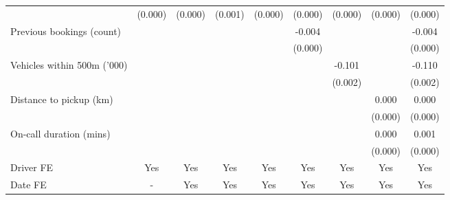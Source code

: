 \documentclass[reviewmode]{AEA}
\begin{document}
\begin{landscape}
\begin{table}
{\begin{tabular}{l*{8}{S}}
			                    &     (0.000)         &     (0.000)         &     (0.001)         &     (0.000)         &     (0.000)         &     (0.000)         &     (0.000)         &     (0.000)         \\
			\addlinespace
			Previous bookings (count)&                     &                     &                     &                     &      -0.004&                     &                     &      -0.004\\
			                    &                     &                     &                     &                     &     (0.000)         &                     &                     &     (0.000)         \\
			\addlinespace
			Vehicles within 500m ('000)&                     &                     &                     &                     &                     &      -0.101&                     &      -0.110\\
			                    &                     &                     &                     &                     &                     &     (0.002)         &                     &     (0.002)         \\
			\addlinespace
			Distance to pickup (km)&                     &                     &                     &                     &                     &                     &       0.000         &       0.000         \\
			                    &                     &                     &                     &                     &                     &                     &     (0.000)         &     (0.000)         \\
			\addlinespace
			On-call duration (mins)&                     &                     &                     &                     &                     &                     &       0.000&       0.001\\
			                    &                     &                     &                     &                     &                     &                     &     (0.000)         &     (0.000)         \\
			\addlinespace
			Driver FE           &       {Yes}         &       {Yes}         &       {Yes}         &       {Yes}         &       {Yes}         &       {Yes}         &       {Yes}         &       {Yes}         \\
			\addlinespace
			Date FE           &       {-}         &       {Yes}         &       {Yes}         &       {Yes}         &       {Yes}         &       {Yes}         &       {Yes}         &       {Yes}         \\

\end{tabular}}
\end{table}
\end{landscape}
\end{document}
